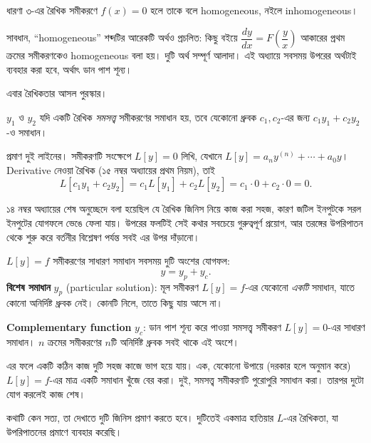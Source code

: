 \documentclass[11pt]{article}
\begin{document}
\begin{idea}
ধারণা ৩-এর রৈখিক সমীকরণে $f(x) = 0$ হলে তাকে বলে homogeneous, নইলে
inhomogeneous।
\end{idea}

\begin{remark}
সাবধান, ``homogeneous'' শব্দটির আরেকটি অর্থও প্রচলিত: কিছু বইয়ে
$\dfrac{dy}{dx} = F\left( \dfrac{y}{x} \right)$ আকারের প্রথম ক্রমের সমীকরণকেও
homogeneous বলা হয়। দুটি অর্থ সম্পূর্ণ আলাদা। এই অধ্যায়ে সবসময় উপরের
অর্থটাই ব্যবহার করা হবে, অর্থাৎ ডান পাশ শূন্য।
\end{remark}

এবার রৈখিকতার আসল পুরস্কার।

\begin{idea}
$y_{1}$ ও $y_{2}$ যদি একটি রৈখিক \emph{সমসত্ত্ব} সমীকরণের সমাধান হয়, তবে
যেকোনো ধ্রুবক $c_{1}, c_{2}$-এর জন্য $c_{1}y_{1} + c_{2}y_{2}$-ও সমাধান।
\end{idea}

প্রমাণ দুই লাইনের। সমীকরণটি সংক্ষেপে $L[y] = 0$ লিখি, যেখানে
$L[y] = a_{n}y^{(n)} + \cdots + a_{0}y$। Derivative নেওয়া রৈখিক (১৫ নম্বর
অধ্যায়ের প্রথম নিয়ম), তাই
\[
  L\left[ c_{1}y_{1} + c_{2}y_{2} \right]
  = c_{1}L[y_{1}] + c_{2}L[y_{2}] = c_{1} \cdot 0 + c_{2} \cdot 0 = 0 .
\]

১৪ নম্বর অধ্যায়ের শেষ অনুচ্ছেদে বলা হয়েছিল যে রৈখিক জিনিস নিয়ে কাজ করা
সহজ, কারণ জটিল ইনপুটকে সরল ইনপুটের যোগফলে ভেঙে ফেলা যায়। উপরের ফলটিই সেই
কথার সবচেয়ে গুরুত্বপূর্ণ প্রয়োগ, আর তরঙ্গের উপরিপাতন থেকে শুরু করে বর্তনীর
বিশ্লেষণ পর্যন্ত সবই এর উপর দাঁড়ানো।

\begin{idea}
$L[y] = f$ সমীকরণের সাধারণ সমাধান সবসময় দুটি অংশের যোগফল:
\[
  y = y_{p} + y_{c} .
\]
\textbf{বিশেষ সমাধান} $y_{p}$ (particular solution): মূল সমীকরণ $L[y] = f$-এর
যেকোনো \emph{একটি} সমাধান, যাতে কোনো অনির্দিষ্ট ধ্রুবক নেই। কোনটি নিলে, তাতে
কিছু যায় আসে না।

\textbf{Complementary function} $y_{c}$: ডান পাশ শূন্য করে পাওয়া সমসত্ত্ব
সমীকরণ $L[y] = 0$-এর সাধারণ সমাধান। $n$ ক্রমের সমীকরণের $n$টি অনির্দিষ্ট ধ্রুবক
সবই থাকে এই অংশে।
\end{idea}

এর ফলে একটি কঠিন কাজ দুটি সহজ কাজে ভাগ হয়ে যায়। এক, যেকোনো উপায়ে (দরকার হলে
অনুমান করে) $L[y] = f$-এর মাত্র একটি সমাধান খুঁজে বের করা। দুই, সমসত্ত্ব
সমীকরণটি পুরোপুরি সমাধান করা। তারপর দুটো যোগ করলেই কাজ শেষ।

কথাটি কেন সত্য, তা দেখাতে দুটি জিনিস প্রমাণ করতে হবে। দুটিতেই একমাত্র হাতিয়ার
$L$-এর রৈখিকতা, যা উপরিপাতনের প্রমাণে ব্যবহার করেছি।
\end{document}
